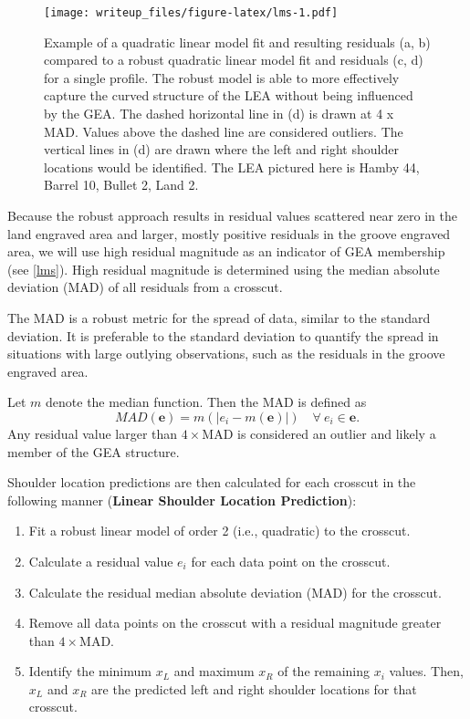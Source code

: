 \documentclass[12pt]{article}
\begin{document}
\begin{figure}
\centering
\texttt{[image: writeup\_files/figure-latex/lms-1.pdf]}
\caption{\label{lms}Example of a quadratic linear model fit and
resulting residuals (a, b) compared to a robust quadratic linear model
fit and residuals (c, d) for a single profile. The robust model is able
to more effectively capture the curved structure of the LEA without
being influenced by the GEA. The dashed horizontal line in (d) is drawn
at 4 x MAD. Values above the dashed line are considered outliers. The
vertical lines in (d) are drawn where the left and right shoulder
locations would be identified. The LEA pictured here is Hamby 44, Barrel
10, Bullet 2, Land 2.}
\end{figure}

Because the robust approach results in residual values scattered near
zero in the land engraved area and larger, mostly positive residuals in
the groove engraved area, we will use high residual magnitude as an
indicator of GEA membership (see \autoref{lms}). High residual magnitude
is determined using the median absolute deviation (MAD) of all residuals
from a crosscut.

The MAD is a robust metric for the spread of data, similar to the
standard deviation. It is preferable to the standard deviation to
quantify the spread in situations with large outlying observations, such
as the residuals in the groove engraved area.

Let \(m\) denote the median function. Then the MAD is defined as
\[ MAD(\mathbf{e}) = m(|e_i- m(\mathbf{e})|) \quad \forall\ e_i \in \mathbf{e}.\]
Any residual value larger than \(4 \times\)MAD is considered an outlier
and likely a member of the GEA structure.

Shoulder location predictions are then calculated for each crosscut in
the following manner (\textbf{Linear Shoulder Location Prediction}):\\

\begin{enumerate}
\item Fit a robust linear model of order 2 (i.e., quadratic) to the crosscut.   
\item Calculate a residual value $e_i$ for each data point on the crosscut.  
\item Calculate the residual median absolute deviation (MAD) for the crosscut.  
\item Remove all data points on the crosscut with a residual magnitude greater than $4 \times$MAD.  
\item Identify the minimum $x_{L}$ and maximum $x_{R}$ of the remaining $x_i$ values. Then, $x_L$ and $x_R$ are the predicted left and right shoulder locations for that crosscut.   
\end{enumerate}
\end{document}
